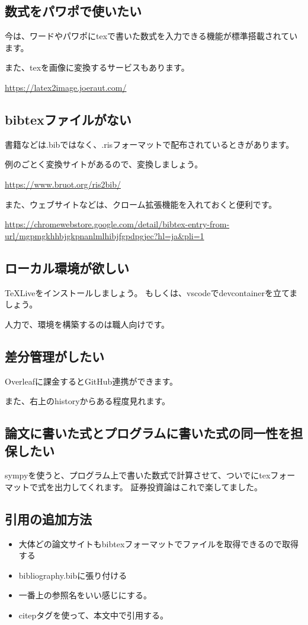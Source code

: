 \subsection{数式をパワポで使いたい}

今は、ワードやパワポにtexで書いた数式を入力できる機能が標準搭載されています。

また、texを画像に変換するサービスもあります。

\url{https://latex2image.joeraut.com/}

\subsection{bibtexファイルがない}

書籍などは.bibではなく、.risフォーマットで配布されているときがあります。

例のごとく変換サイトがあるので、変換しましょう。

\url{https://www.bruot.org/ris2bib/}

また、ウェブサイトなどは、クローム拡張機能を入れておくと便利です。

\url{https://chromewebstore.google.com/detail/bibtex-entry-from-url/mgpmgkhhbjgkpnanlmlhibjfgpdpgjec?hl=ja&pli=1}

\subsection{ローカル環境が欲しい}

TeXLiveをインストールしましょう。
もしくは、vscodeでdevcontainerを立てましょう。

人力で、環境を構築するのは職人向けです。

\subsection{差分管理がしたい}

Overleafに課金するとGitHub連携ができます。

また、右上のhistoryからある程度見れます。

\subsection{論文に書いた式とプログラムに書いた式の同一性を担保したい}

sympyを使うと、プログラム上で書いた数式で計算させて、ついでにtexフォーマットで式を出力してくれます。
証券投資論はこれで楽してました。

\subsection{引用の追加方法}

\begin{itemize}
    \item 大体どの論文サイトもbibtexフォーマットでファイルを取得できるので取得する
    \item bibliography.bibに張り付ける
    \item 一番上の参照名をいい感じにする。
    \item citepタグを使って、本文中で引用する。
\end{itemize}